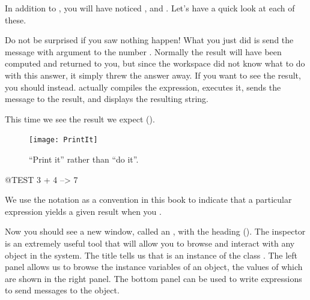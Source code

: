 \documentclass[a4paper,10pt,twoside]{book}
\begin{document}

In addition to , you will have noticed ,  and .
Let's have a quick look at each of these.


Do not be surprised if you saw nothing happen!
What you just did is send the message \ct{+} with argument  to the number .
Normally the result  will have been computed and returned to you, but since the workspace did not know what to do with this answer, it simply threw the answer away.
If you want to see the result, you should  instead.
 actually compiles the expression, executes it, sends the message  to the result, and displays the resulting string.

This time we see the result we expect ().

\begin{figure}[htb]
\centerline {\texttt{[image: PrintIt]}}
\caption{``Print it'' rather than ``do it''. \label{fig:printit}}
\end{figure}

\begin{code}{@TEST}
3 + 4 --> 7
\end{code}
\noindent
We use the notation \ct{-->} as a convention in this book to indicate that a particular \sq expression yields a given result when you .

\noindent
Now you should see a new window, called an , with the heading  ().
The inspector is an extremely useful tool that will allow you to browse and interact with any object in the system.
The title tells us that  is an instance of the class .
The left panel allows us to browse the instance variables of an object, the values of which are shown in the right panel.
The bottom panel can be used to write expressions to send messages to the object.
\end{document}
